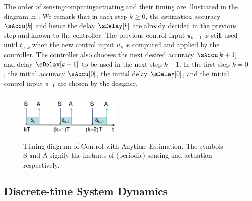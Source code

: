 The order of sensing\textendash{}computing\textendash{}actuating and
their timing are illustrated in the diagram in .
We remark that in each step $k\geq0$, the estimation accuracy $\sAccu[k]$
and hence the delay $\sDelay[k]$ are already decided in the previous
step and known to the controller. The previous control input $u_{k-1}$
is still used until $t_{a,k}$ when the new control input $u_{k}$
is computed and applied by the controller. The controller also chooses
the next desired accuracy $\sAccu[k+1]$ and delay $\sDelay[k+1]$
to be used in the next step $k+1$. In the first step $k=0$, the
initial accuracy $\sAccu[0]$, the initial delay $\sDelay[0]$, and
the initial control input $u_{-1}$ are chosen by the designer.


\begin{figure}[tb]
	\centering
		\includegraphics[width=0.45\textwidth,height=24mm]{figs/Timing_Diag.pdf}
	\caption{Timing diagram of Control with Anytime Estimation.  The symbols S and A signify the instants of (periodic) sensing and actuation respectively.}
	\label{fig:timing-diagram}
\end{figure}




\subsection{Discrete-time System Dynamics}

